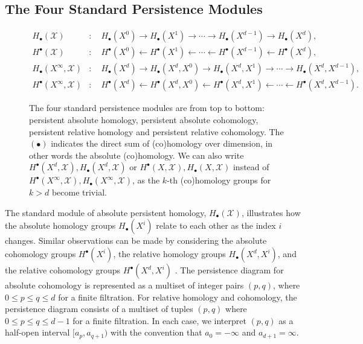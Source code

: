 \subsection{The Four Standard Persistence Modules}
\label{TheFourStandardPersistenceModules}
\begin{figure}[t!]
	\begin{align*}
		H_{\bullet}(\mathcal{X})             & : \quad H_{\bullet}(X^{0}) \rightarrow H_{\bullet}(X^{1}) \rightarrow \cdots \rightarrow H_{\bullet}(X^{d-1}) \rightarrow H_{\bullet}(X^{d}),             \\
		H^{\bullet}(\mathcal{X})             & : \quad H^{\bullet}(X^{0}) \leftarrow H^{\bullet}(X^{1}) \leftarrow \cdots \leftarrow H^{\bullet}(X^{d-1}) \leftarrow H^{\bullet}(X^{d}),                \\
		H_{\bullet}(X^{\infty}, \mathcal{X}) & : \quad H_{\bullet}(X^{d}) \rightarrow H_{\bullet}(X^{d},X^{0}) \rightarrow H_{\bullet}(X^{d},X^{1}) \rightarrow \cdots \rightarrow H_{\bullet}(X^{d},X^{d-1}), \\
		H^{\bullet}(X^{\infty}, \mathcal{X}) & : \quad H^{\bullet}(X^{d}) \leftarrow H^{\bullet}(X^{d},X^{0}) \leftarrow H^{\bullet}(X^{d},X^{1}) \leftarrow \cdots \leftarrow H^{\bullet}(X^{d}, X^{d-1}).
	\end{align*}
	\caption{The four standard persistence modules are from top to bottom: persistent absolute homology, persistent absolute cohomology, persistent relative homology and persistent relative cohomology. The $(\bullet)$ indicates the direct sum of (co)homology over dimension, in other words the absolute (co)homology. We can also write $H^{\bullet}(X^{d}, \mathcal{X}), H_{\bullet}(X^{d}, \mathcal{X})$ or $H^{\bullet}(X, \mathcal{X}), H_{\bullet}(X, \mathcal{X})$ instead of $H^{\bullet}(X^{\infty}, \mathcal{X}), H_{\bullet}(X^{\infty}, \mathcal{X})$, as the $k$-th (co)homology groups for $k > d$ become trivial.}
\end{figure}
The standard module of absolute persistent homology, $H_{\bullet}(\mathcal{X})$, illustrates how the absolute homology groups
$H_{\bullet}(X^{i})$ relate to each other as the index $i$ changes. Similar observations
can be made by considering the absolute cohomology groups $H^{\bullet}(X^{i})$,
the relative homology groups $H_{\bullet}(X^{d}, X^{i})$, and the relative cohomology
groups $H^{\bullet}(X^{d}, X^{i})$ \cite[\S 2.4]{de2011dualities}. The persistence diagram for absolute cohomology is represented as a multiset of integer
pairs $(p,q)$, where $0 \leq p \leq q \leq d$ for a finite filtration. For relative
homology and cohomology, the persistence diagram consists of a multiset of
tuples $(p,q)$ where $0 \leq p \leq q \leq d-1$ for a finite filtration. In each
case, we interpret $(p,q)$ as a half-open interval $[a_{p}, a_{q+1})$ with the
convention that $a_{0} = -\infty$ and $a_{d+1} = \infty$.

